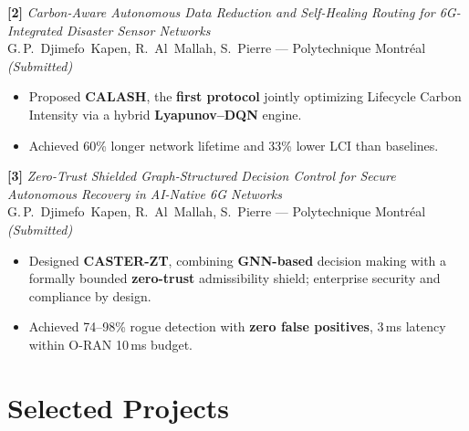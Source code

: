 \documentclass[10pt,a4paper,sans]{moderncv}
\begin{document}
\vspace{0.4em}
\textbf{[2]} \textit{Carbon-Aware Autonomous Data Reduction and Self-Healing
Routing for 6G-Integrated Disaster Sensor Networks}\\
G.\,P.~Djimefo~Kapen, R.~Al~Mallah, S.~Pierre --- Polytechnique
Montréal \hfill \textit{(Submitted)}
\begin{itemize}[leftmargin=1.5em, topsep=2pt, itemsep=0pt, parsep=0pt]
  \item Proposed \textbf{CALASH}, the \textbf{first protocol} jointly optimizing
        Lifecycle Carbon Intensity via a hybrid \textbf{Lyapunov--DQN} engine.
  \item Achieved 60\% longer network lifetime and 33\% lower LCI than baselines.
\end{itemize}

\vspace{0.4em}
\textbf{[3]} \textit{Zero-Trust Shielded Graph-Structured Decision Control for
Secure Autonomous Recovery in AI-Native 6G Networks}\\
G.\,P.~Djimefo~Kapen, R.~Al~Mallah, S.~Pierre --- Polytechnique
Montréal \hfill \textit{(Submitted)}
\begin{itemize}[leftmargin=1.5em, topsep=2pt, itemsep=0pt, parsep=0pt]
  \item Designed \textbf{CASTER-ZT}, combining \textbf{GNN-based} decision making
        with a formally bounded \textbf{zero-trust} admissibility shield;
        enterprise security and compliance by design.
  \item Achieved 74--98\% rogue detection with \textbf{zero false positives},
        3\,ms latency within O-RAN 10\,ms budget.
\end{itemize}

\section{Selected Projects}

\end{document}
